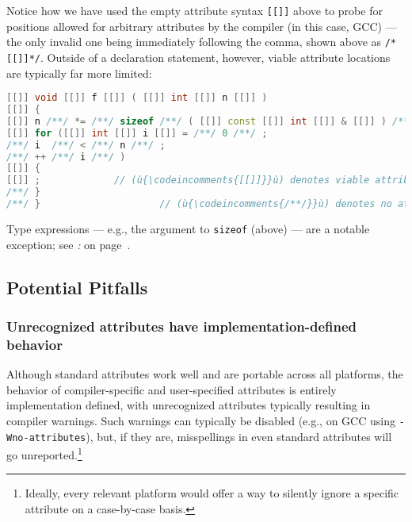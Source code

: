 \noindent Notice how we have used the empty attribute syntax \texttt{[[]]} above
to probe for positions allowed for arbitrary attributes by the compiler
(in this case, GCC) --- the only invalid one being immediately following
the comma, shown above as \texttt{/*[[]]*/}. Outside of a declaration
statement, however, viable attribute locations are typically far more
limited:

\begin{lstlisting}[language=C++,label=attribute-gcc-example]
[[]] void [[]] f [[]] ( [[]] int [[]] n [[]] )
[[]] {
[[]] n /**/ *= /**/ sizeof /**/ ( [[]] const [[]] int [[]] & [[]] ) /**/;
[[]] for ([[]] int [[]] i [[]] = /**/ 0 /**/ ;
/**/ i  /**/ < /**/ n /**/ ;
/**/ ++ /**/ i /**/ )
[[]] {
[[]] ;             // (ù{\codeincomments{[[]]}}ù) denotes viable attribute location (on GCC)
/**/ }
/**/ }                     // (ù{\codeincomments{/**/}}ù) denotes no attribute allowed (on GCC)
\end{lstlisting}

\noindent Type expressions --- e.g., the argument to \texttt{sizeof} (above) ---
are a notable exception; see {\it{}:} {\it{}} on page~\pageref{not-every-syntactic-location-is-viable-for-an-attribute}.

\subsection[Potential Pitfalls]{Potential Pitfalls}\label{attribute-potential-pitfalls}

\subsubsection[Unrecognized attributes have implementation-defined behavior]{Unrecognized attributes have implementation-defined behavior}\label{unrecognized-attributes-have-implementation-defined-behavior}

Although standard attributes work well and are portable across all
platforms, the behavior of compiler-specific and user-specified
attributes is entirely implementation defined, with unrecognized
attributes typically resulting in compiler warnings. Such warnings can typically be disabled (e.g., on GCC using
\texttt{-Wno-attributes}), but, if they are, misspellings in even standard
attributes will go unreported.{\cprotect\footnote{Ideally, every relevant platform would offer a way to silently ignore a specific
attribute on a case-by-case basis.}}

